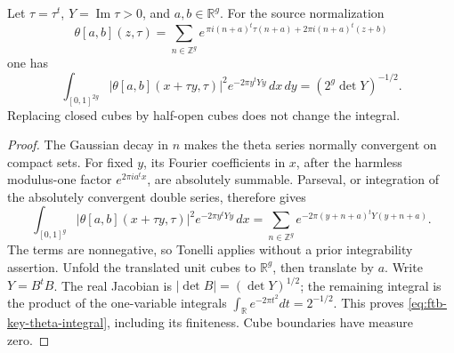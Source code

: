 \begin{srlemma}
\label{lem:ftb-key-canonical-theta-integral}
Let \(\tau=\tau^t\), \(Y=\operatorname{Im}\tau>0\), and
\(a,b\in\mathbb R^g\).  For the source normalization
\[
 \theta[a,b](z,\tau)=
 \sum_{n\in\mathbb Z^g}
 e^{\,\pi i(n+a)^t\tau(n+a)+2\pi i(n+a)^t(z+b)}
\]
one has
\[
 \int_{[0,1]^{2g}}
 |\theta[a,b](x+\tau y,\tau)|^2e^{-2\pi y^tYy}\,dx\,dy
                           =(2^g\det Y)^{-1/2}.
 \tag{A1}\label{eq:ftb-key-theta-integral}
\]
Replacing closed cubes by half-open cubes does not change the
integral.
\end{srlemma}
\begin{proof}
The Gaussian decay in \(n\) makes the theta series normally
convergent on compact sets.
For fixed \(y\), its Fourier coefficients in \(x\), after
the harmless modulus-one factor \(e^{2\pi i a^tx}\), are
absolutely summable.
Parseval, or integration of the absolutely convergent double
series, therefore gives
\[
 \int_{[0,1]^g}|\theta[a,b](x+\tau y,\tau)|^2
                         e^{-2\pi y^tYy}\,dx
       =\sum_{n\in\mathbb Z^g}
                    e^{-2\pi(y+n+a)^tY(y+n+a)}.
\]
The terms are nonnegative, so Tonelli applies without a
prior integrability assertion.
Unfold the translated unit cubes to \(\mathbb R^g\),
then translate by \(a\).
Write \(Y=B^tB\).
The real Jacobian is \(|\det B|=(\det Y)^{1/2}\);
the remaining integral is the product of the one-variable
integrals \(\int_{\mathbb R}e^{-2\pi t^2}dt=2^{-1/2}\).
This proves \eqref{eq:ftb-key-theta-integral}, including its
finiteness.
Cube boundaries have measure zero.
\end{proof}

